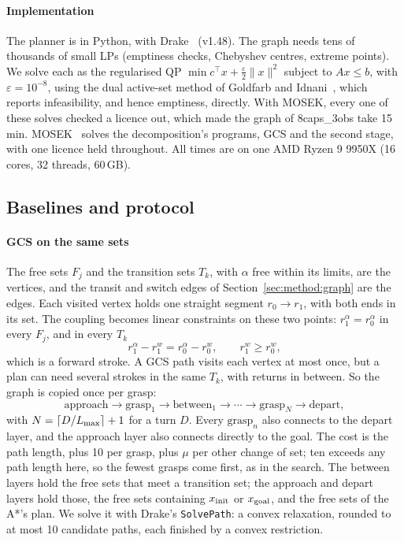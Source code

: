 \paragraph{Implementation} The planner is in Python, with
Drake~\cite{tedrake2019drake} (v1.48). The graph needs tens of thousands of
small LPs (emptiness checks, Chebyshev centres, extreme points). We solve each
as the regularised QP $\min c^\top x+\tfrac{\varepsilon}{2}\|x\|^2$ subject to
$Ax\le b$, with $\varepsilon=10^{-8}$, using the dual active-set method of
Goldfarb and Idnani~\cite{goldfarb1983dual}, which reports infeasibility, and
hence emptiness, directly. With MOSEK, every one of these solves checked a
licence out, which made the graph of \textsf{8caps\_3obs} take 15\,min.
MOSEK~\cite{mosek} solves the decomposition's programs, GCS and the second
stage, with one licence held throughout. All times are on one AMD Ryzen 9
9950X (16 cores, 32 threads, 60\,GB).

\subsection{Baselines and protocol}
\label{sec:experiments:protocol}

\paragraph{GCS on the same sets} The free sets $F_j$ and the transition sets
$T_k$, with $\alpha$ free within its limits, are the vertices, and the transit
and switch edges of Section~\ref{sec:method:graph} are the edges. Each visited
vertex holds one straight segment $r_0\to r_1$, with both ends in its set. The
coupling becomes linear constraints on these two points: $r_1^{\alpha}=r_0^{\alpha}$
in every $F_j$, and in every $T_k$
\[
r_1^{\alpha}-r_1^{w}=r_0^{\alpha}-r_0^{w}, \qquad r_1^{w}\ge r_0^{w},
\]
which is a forward stroke. A GCS path visits each vertex at most once, but a
plan can need several strokes in the same $T_k$, with returns in between. So
the graph is copied once per grasp:
\[
\text{approach}\to\text{grasp}_1\to\text{between}_1\to\cdots\to\text{grasp}_N\to\text{depart},
\]
with $N=\lceil D/L_{\max}\rceil+1$ for a turn $D$. Every $\text{grasp}_n$ also
connects to the depart layer, and the approach layer also connects directly to
the goal. The cost is the path length, plus 10 per grasp, plus $\mu$ per other
change of set; ten exceeds any path length here, so the fewest grasps come
first, as in the search. The between layers hold the free sets that meet a
transition set; the approach and depart layers hold those, the free sets
containing $x_{\mathrm{init}}$ or $x_{\mathrm{goal}}$, and the free sets of the A*'s plan. We solve
it with Drake's \texttt{SolvePath}: a convex relaxation, rounded to at most 10
candidate paths, each finished by a convex restriction.

